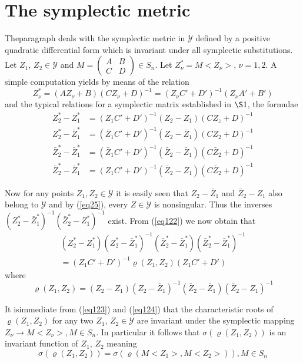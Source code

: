 
\chapter{The symplectic  metric}%

The\pageoriginale paragraph deals with the symplectic metric in $\mathscr{Y}$
defined by a positive quadratic differential form which is invariant
under all symplectic substitutions. Let $Z_1$, $Z_2 \in \mathscr{Y}$
and $M = \begin{pmatrix} A & B \\ C & D \end{pmatrix}\in S_n$. Let
$Z^*_\nu = M <Z_\nu>$, $\nu = 1, 2$. A simple computation yields by means
of the relation 
$$
Z^*_\nu = (A Z_\nu + B)(CZ_\nu +D)^{-1} = (Z_\nu C' + D')^{-1} (Z_\nu
A' + B') 
$$ 
and the typical relations for a symplectic  matrix established in $\S
1$, the formulae 
\begin{align*}
Z^*_2 - Z^*_1 & = (Z_1 C' + D')^{-1} (Z_2 - Z_1) (CZ_z + D)^{-1} \\ 
Z^*_2 - \bar{Z}^*_1 & = (\bar{Z}_1C' + D')^{-1} (Z_2 - \bar{Z}_1) (CZ_2 +
D)^{-1} \\ 
\bar{Z}^*_2 - \bar{Z}^*_1 & = (\bar{Z}_1C' + D')^{-1} (\bar{Z}_2 -
\bar{Z}_1) (C \bar{Z}_2+ D)^{-1} \tag{122}\label{eq122} \\ 
\bar{Z}^*_2 - \bar{Z}^*_1 & = (Z_1C' + D')^{-1} (\bar{Z}_2 - {Z}_1)
(C \bar{Z}_2+ D)^{-1} 
\end{align*}

Now for any points $Z_1, Z_2 \in \mathscr{Y}$ it is easily seen that
$Z_2 - \bar{Z}_1$ and $\bar{Z}_2 - Z_1$ also belong to $\mathscr{Y}$
and by (\ref{eq25}), every $Z \in \mathscr{Y}$ is nonsingular. Thus the
inverses $(Z^*_2 - \bar{Z}^*_1)^{-1} (\bar{Z}^\ast_2 - Z^\ast_1)^{-1}$
exist. From (\ref{eq122}) we now obtain that  
\begin{gather*}
(Z^*_2 - Z^*_1) (Z^*_2 - \bar{Z}^*_1)^{-1} (\bar{Z}^\ast_2 -
  \bar{Z}^\ast_1)(\bar{Z}^*_2 - 
  \bar{Z}^*_1)^{-1} \tag{123}\label{eq123}\\ 
= (Z_1 C' + D')^{-1} \varrho (Z_1 , Z_2) (Z_1 C' + D')
\end{gather*}
where
\begin{equation*}
\varrho (Z_1 , Z_2) = (Z_2 - Z_1) (Z_2 - \bar{Z}_1)^{-1} (\bar{Z}_2 -
\bar{Z}_1) (\bar{Z}_2 - Z_1)^{-1} \tag{124}\label{eq124} 
\end{equation*}

It is\pageoriginale immediate from (\ref{eq123}) and (\ref{eq124}) that the
characteristic roots 
of $\varrho (Z_1 , Z_2)$ for any two $Z_1$, $Z_2 \in \mathscr{Y}$ are
invariant under the symplectic mapping $Z_\nu \rightarrow M < Z_\nu> ,
M \in S_n$. In particular it follows that $\sigma (\varrho(Z_1 ,
Z_2))$ is an invariant function of $Z_1$, $Z_2$ meaning 
\begin{equation*}
\sigma (\varrho(Z_1 , Z_2)) = \sigma  (\varrho (M<Z_1>, M <Z_2>)) , M
\in S_n \tag{125}\label{eq125} 
\end{equation*}

